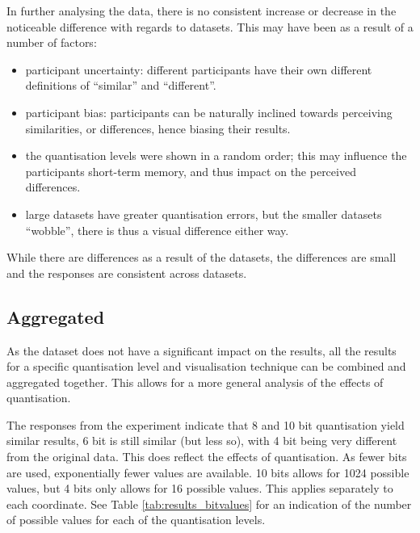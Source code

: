 In further analysing the data, there is no consistent increase or decrease in
the noticeable difference with regards to datasets. This may have been as a
result of a number of factors:
\begin{itemize}

  \item participant uncertainty: different participants have their own
  different definitions of ``similar'' and ``different''.

  \item participant bias: participants can be naturally inclined towards
  perceiving similarities, or differences, hence biasing their results.

  \item the quantisation levels were shown in a random order; this may
  influence the participants short-term memory, and thus impact on the
  perceived differences.

  \item large datasets have greater quantisation errors, but the smaller
  datasets ``wobble'', there is thus a visual difference either way.

\end{itemize}

While there are differences as a result of the datasets, the differences are
small and the responses are consistent across datasets.


\subsection*{Aggregated}
\label{sub:results_discussion_aggregated}

As the dataset does not have a significant impact on the results, all the
results for a specific quantisation level and visualisation technique can be
combined and aggregated together. This allows for a more general analysis of
the effects of quantisation.

The responses from the experiment indicate that 8 and 10 bit quantisation yield
similar results, 6 bit is still similar (but less so), with 4 bit being very
different from the original data. This does reflect the effects of
quantisation. As fewer bits are used, exponentially fewer values are available.
10 bits allows for 1024 possible values, but 4 bits only allows for 16 possible
values. This applies separately to each coordinate. See Table
\ref{tab:results_bitvalues} for an indication of the number of possible values
for each of the quantisation levels.

